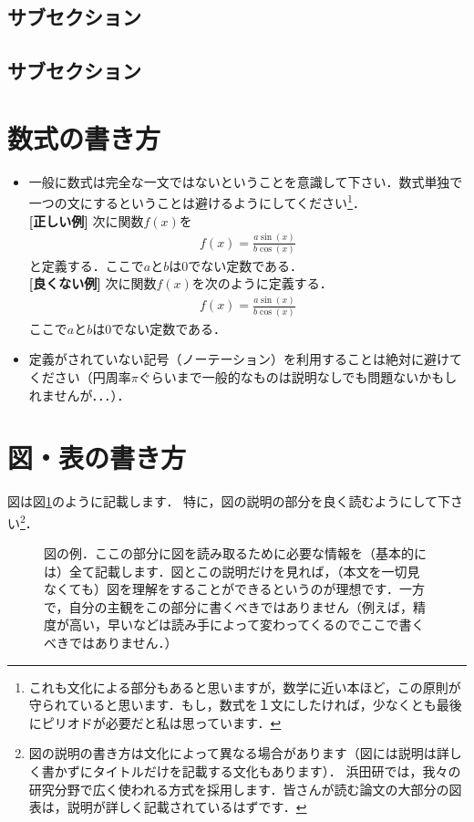 \documentclass[dvipdfmx,autodetect-engine]{jsreport}
\begin{document}
\subsection{サブセクション}


\subsection{サブセクション}

\section{数式の書き方}

\begin{itemize}
\item 一般に数式は完全な一文ではないということを意識して下さい．数式単独で一つの文にするということは避けるようにしてください\footnote{これも文化による部分もあると思いますが，数学に近い本ほど，この原則が守られていると思います．もし，数式を１文にしたければ，少なくとも最後にピリオドが必要だと私は思っています．}．\\
%
\textbf{[正しい例] }
次に関数$f(x)$を
\begin{align*}
f(x) = \frac{a \sin(x)}{b \cos(x)}
\end{align*}
と定義する．ここで$a$と$b$は0でない定数である．\\
\textbf{[良くない例] }
次に関数$f(x)$を次のように定義する．
\begin{align*}
f(x) = \frac{a \sin(x)}{b \cos(x)}
\end{align*}
ここで$a$と$b$は0でない定数である．
\item 定義がされていない記号（ノーテーション）を利用することは絶対に避けてください（円周率$\pi$ぐらいまで一般的なものは説明なしでも問題ないかもしれませんが．．．）．
\end{itemize}

\section{図・表の書き方}

図は図\ref{fig:example}のように記載します．
特に，図の説明の部分を良く読むようにして下さい\footnote{図の説明の書き方は文化によって異なる場合があります（図には説明は詳しく書かずにタイトルだけを記載する文化もあります）．
浜田研では，我々の研究分野で広く使われる方式を採用します．皆さんが読む論文の大部分の図表は，説明が詳しく記載されているはずです．}．

\begin{figure}[h]
\vspace{50mm}
\caption{\label{fig:example}
図の例．ここの部分に図を読み取るために必要な情報を（基本的には）全て記載します．図とこの説明だけを見れば，（本文を一切見なくても）図を理解をすることができるというのが理想です．一方で，自分の主観をこの部分に書くべきではありません（例えば，精度が高い，早いなどは読み手によって変わってくるのでここで書くべきではありません．）
}
\end{figure}
\end{document}
